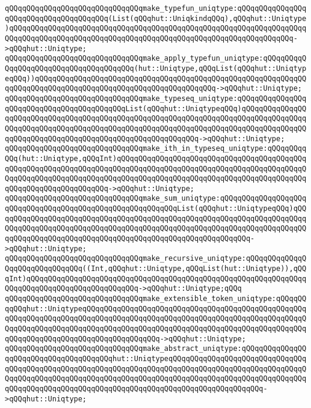 \verb|qQQqqQQqqQQqqQQqqQQqqQQqqQQqqQQqmake_typefun_uniqtype:qQQqqQQqqQQqqQQqqQQqqQQqqQQqqQQqqQQqqQQq(List(qQQqhut::UniqkindqQQq),qQQqhut::Uniqtype)qQQqqQQqqQQqqQQqqQQqqQQqqQQqqQQqqQQqqQQqqQQqqQQqqQQqqQQqqQQqqQQqqQQqqQQqqQQqqQQqqQQqqQQqqQQqqQQqqQQqqQQqqQQqqQQqqQQqqQQqqQQqqQQqqQQqqQQq->qQQqhut::Uniqtype;|\newline
\verb|qQQqqQQqqQQqqQQqqQQqqQQqqQQqqQQqmake_apply_typefun_uniqtype:qQQqqQQqqQQqqQQqqQQqqQQqqQQqqQQqqQQqqQQq(hut::Uniqtype,qQQqList(qQQqhut::UniqtypeqQQq))qQQqqQQqqQQqqQQqqQQqqQQqqQQqqQQqqQQqqQQqqQQqqQQqqQQqqQQqqQQqqQQqqQQqqQQqqQQqqQQqqQQqqQQqqQQqqQQqqQQqqQQqqQQqqQQq->qQQqhut::Uniqtype;|\newline
\verb|qQQqqQQqqQQqqQQqqQQqqQQqqQQqqQQqmake_typeseq_uniqtype:qQQqqQQqqQQqqQQqqQQqqQQqqQQqqQQqqQQqqQQqqQQqList(qQQqhut::UniqtypeqQQq)qQQqqQQqqQQqqQQqqQQqqQQqqQQqqQQqqQQqqQQqqQQqqQQqqQQqqQQqqQQqqQQqqQQqqQQqqQQqqQQqqQQqqQQqqQQqqQQqqQQqqQQqqQQqqQQqqQQqqQQqqQQqqQQqqQQqqQQqqQQqqQQqqQQqqQQqqQQqqQQqqQQqqQQqqQQqqQQqqQQqqQQqqQQqqQQqqQQqqQQq->qQQqhut::Uniqtype;|\newline
\verb|qQQqqQQqqQQqqQQqqQQqqQQqqQQqqQQqmake_ith_in_typeseq_uniqtype:qQQqqQQqqQQq(hut::Uniqtype,qQQqInt)qQQqqQQqqQQqqQQqqQQqqQQqqQQqqQQqqQQqqQQqqQQqqQQqqQQqqQQqqQQqqQQqqQQqqQQqqQQqqQQqqQQqqQQqqQQqqQQqqQQqqQQqqQQqqQQqqQQqqQQqqQQqqQQqqQQqqQQqqQQqqQQqqQQqqQQqqQQqqQQqqQQqqQQqqQQqqQQqqQQqqQQqqQQqqQQqqQQqqQQqqQQqqQQq->qQQqhut::Uniqtype;|\newline
\verb|qQQqqQQqqQQqqQQqqQQqqQQqqQQqqQQqmake_sum_uniqtype:qQQqqQQqqQQqqQQqqQQqqQQqqQQqqQQqqQQqqQQqqQQqqQQqqQQqqQQqqQQqList(qQQqhut::UniqtypeqQQq)qQQqqQQqqQQqqQQqqQQqqQQqqQQqqQQqqQQqqQQqqQQqqQQqqQQqqQQqqQQqqQQqqQQqqQQqqQQqqQQqqQQqqQQqqQQqqQQqqQQqqQQqqQQqqQQqqQQqqQQqqQQqqQQqqQQqqQQqqQQqqQQqqQQqqQQqqQQqqQQqqQQqqQQqqQQqqQQqqQQqqQQqqQQqqQQqqQQqqQQq->qQQqhut::Uniqtype;|\newline
\verb|qQQqqQQqqQQqqQQqqQQqqQQqqQQqqQQqmake_recursive_uniqtype:qQQqqQQqqQQqqQQqqQQqqQQqqQQqqQQq((Int,qQQqhut::Uniqtype,qQQqList(hut::Uniqtype)),qQQqInt)qQQqqQQqqQQqqQQqqQQqqQQqqQQqqQQqqQQqqQQqqQQqqQQqqQQqqQQqqQQqqQQqqQQqqQQqqQQqqQQqqQQqqQQqqQQqqQQq->qQQqhut::Uniqtype;qQQq|\newline
\verb|qQQqqQQqqQQqqQQqqQQqqQQqqQQqqQQqmake_extensible_token_uniqtype:qQQqqQQqqQQqhut::UniqtypeqQQqqQQqqQQqqQQqqQQqqQQqqQQqqQQqqQQqqQQqqQQqqQQqqQQqqQQqqQQqqQQqqQQqqQQqqQQqqQQqqQQqqQQqqQQqqQQqqQQqqQQqqQQqqQQqqQQqqQQqqQQqqQQqqQQqqQQqqQQqqQQqqQQqqQQqqQQqqQQqqQQqqQQqqQQqqQQqqQQqqQQqqQQqqQQqqQQqqQQqqQQqqQQqqQQqqQQqqQQqqQQqqQQq->qQQqhut::Uniqtype;|\newline
\verb|qQQqqQQqqQQqqQQqqQQqqQQqqQQqqQQqmake_abstract_uniqtype:qQQqqQQqqQQqqQQqqQQqqQQqqQQqqQQqqQQqqQQqhut::UniqtypeqQQqqQQqqQQqqQQqqQQqqQQqqQQqqQQqqQQqqQQqqQQqqQQqqQQqqQQqqQQqqQQqqQQqqQQqqQQqqQQqqQQqqQQqqQQqqQQqqQQqqQQqqQQqqQQqqQQqqQQqqQQqqQQqqQQqqQQqqQQqqQQqqQQqqQQqqQQqqQQqqQQqqQQqqQQqqQQqqQQqqQQqqQQqqQQqqQQqqQQqqQQqqQQqqQQqqQQqqQQqqQQqqQQqqQQq->qQQqhut::Uniqtype;|\newline
